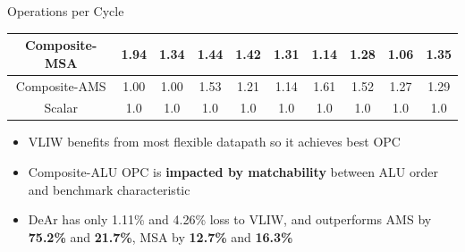\documentclass[handout]{beamer}
\begin{document}
\begin{CJK}{UTF8}{bkai}
\begin{frame}{Operations per Cycle}
\begin{table}[!ht]
{\begin{tabular}{|c|c|c|c|c|c|c|c|c|c|}
                            Composite-MSA  &   1.94  &   1.34  &   1.44  &   1.42  &   1.31  &   1.14  &   1.28  &   1.06  &   1.35     \\ \hline 
                            Composite-AMS  &   1.00  &   1.00  &   1.53  &   1.21  &   1.14  &   1.61  &   1.52  &   1.27  &   1.29     \\ \hline 
                            Scalar  & 1.0  & 1.0  & 1.0  & 1.0  & 1.0  & 1.0  & 1.0  & 1.0  & 1.0 \\ \hline 
                        \end{tabular}
                    }
                \end{table}
                \vspace{-1em}
                \begin{itemize}
                    \item <2->{VLIW benefits from most flexible datapath so it achieves best OPC}
                    \item <3->{Composite-ALU OPC is \textbf{impacted by matchability} between ALU order and benchmark characteristic}
                    \item <4->{DeAr has only 1.11\% and 4.26\% loss to VLIW, 
                                and outperforms AMS by \textbf{75.2\%} and \textbf{21.7\%},
                                    MSA by \textbf{12.7\%} and \textbf{16.3\%}
                                }
                \end{itemize}

            \end{frame}


\end{CJK}
\end{document}
